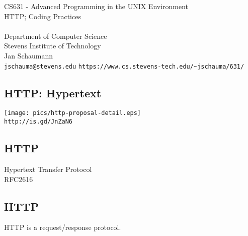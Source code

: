 \documentclass[xga]{xdvislides}
\begin{document}
\setfontphv

\lhead{\slidetitle}                               %
\cfoot{\relax}                               %
\rfoot{\Gray{\today}}

\newcommand{\smallish}{\fontsize{15}{20}\selectfont}

\vspace*{\fill}
\begin{center}
	\Hugesize
		CS631 - Advanced Programming in the UNIX Environment\\ [1em]
		HTTP; Coding Practices\\ [1em]
	\hspace*{5mm}\blueline\\ [1em]
	\Normalsize
		Department of Computer Science\\
		Stevens Institute of Technology\\
		Jan Schaumann\\
		\verb+jschauma@stevens.edu+
		\verb+https://www.cs.stevens-tech.edu/~jschauma/631/+
\end{center}
\vspace*{\fill}

\subsection{HTTP: Hypertext}
\begin{center}
	\texttt{[image: pics/http-proposal-detail.eps]} \\
	\vspace{.5in}
	\verb+http://is.gd/JnZaN6+
\end{center}

\subsection{HTTP}
\vspace{.5in}
\begin{center}
	\Huge
	Hypertext Transfer Protocol
	\\
	\vspace{.5in}
	RFC2616
\end{center}
\Normalsize

\subsection{HTTP}
\vspace{.5in}
\begin{center}
	\Huge
	HTTP is a request/response protocol.
\end{center}
\Normalsize
\end{document}
